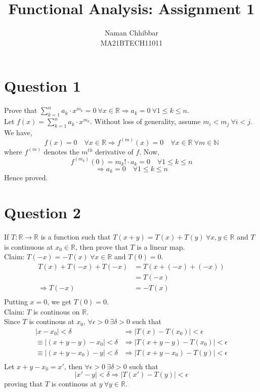 \documentclass{article}
\title{Functional Analysis: Assignment 1}
\author{
	Naman Chhibbar \\
	MA21BTECH11011
}
\date{}
\begin{document}
\maketitle

\section{Question 1}

	Prove that $\sum_{k = 1}^{n} a_k \cdot x^{m_k} = 0 ~ \forall x \in \mathbb{R}
	\Rightarrow  a_k = 0 ~ \forall 1 \le k \le n$. \\

	Let $f(x) = \sum_{k = 1}^{n} a_k \cdot x^{m_k}$.
	Without loss of generality, assume $m_i < m_j ~ \forall i < j$.
	We have,
	\[
		f(x) = 0 \quad \forall x \in \mathbb{R} \Rightarrow
		f^{(m)}(x) = 0 \quad \forall x \in \mathbb{R} ~ \forall m \in \mathbb{N}
	\]
	where $f^{(m)}$ denotes the $m^{th}$ derivative of $f$.
	Now,
	\[ f^{(m_k)}(0) = m_k! \cdot a_k = 0 \quad \forall 1 \le k \le n \]
	\[ \Rightarrow a_k = 0 \quad \forall 1 \le k \le n \]
	Hence proved.

\section{Question 2}

	If $T: \mathbb{R} \to \mathbb{R}$ is a function such that $T(x + y) = T(x) + T(y) ~
	\forall x, y \in \mathbb{R}$ and $T$ is continuous at $x_0 \in \mathbb{R}$, then prove
	that $T$ is a linear map. \\

	Claim: $T(-x) = -T(x) ~ \forall x \in \mathbb{R}$ and $T(0) = 0$.
	\begin{align*}
		T(x) + T(-x) + T(-x) &= T(x + (-x) + (-x)) \\
		&= T(-x) \\
		\Rightarrow T(-x) &= -T(x) \\
	\end{align*}
	Putting $x = 0$, we get $T(0) = 0$. \\

	Claim: $T$ is continous on $\mathbb{R}$. \\
	Since $T$ is continous at $x_0$, $\forall \epsilon > 0 ~ \exists \delta > 0$ such that
	\begin{align*}
		|x - x_0| < \delta &\Rightarrow |T(x) - T(x_0)| < \epsilon \\
		\equiv |(x + y - y) - x_0| < \delta &\Rightarrow |T(x + y - y) - T(x_0)| < \epsilon \\
		\equiv |(x + y - x_0) - y| < \delta &\Rightarrow |T(x + y - x_0) - T(y)| < \epsilon \\
	\end{align*}
	Let $x + y - x_0 = x'$, then $\forall \epsilon > 0 ~ \exists \delta > 0$ such that
	\[ |x' - y| < \delta \Rightarrow |T(x') - T(y)| < \epsilon \]
	proving that $T$ is continous at $y ~ \forall y \in \mathbb{R}$. \\
\end{document}
